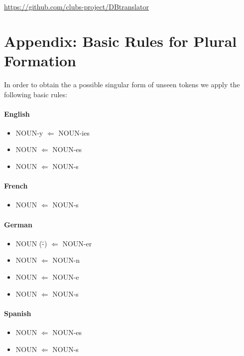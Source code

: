 \documentclass[a4paper,11pt]{article}
\begin{document}
\url{https://github.com/clubs-project/DBtranslator}






%
%
\appendix
\section{Appendix: Basic Rules for Plural Formation}
\label{ap:plural}

In order to obtain the a possible singular form of unseen tokens we apply the following basic rules:

\renewcommand{\labelitemi}{$\star$}
\paragraph{English}
\begin{itemize}
\itemsep-0.2em 
 \item NOUN-y $\Leftarrow$ NOUN-ies
 \item NOUN $\Leftarrow$ NOUN-es
 \item NOUN $\Leftarrow$ NOUN-s
\end{itemize}

\paragraph{French}
\begin{itemize}
\itemsep-0.2em 
 \item NOUN $\Leftarrow$ NOUN-s
\end{itemize}

\paragraph{German}
\begin{itemize}
\itemsep-0.2em 
 \item NOUN (\"-) $\Leftarrow$ NOUN-er
 \item NOUN $\Leftarrow$ NOUN-n
 \item NOUN $\Leftarrow$ NOUN-e
 \item NOUN $\Leftarrow$ NOUN-s
\end{itemize}

\paragraph{Spanish}
\begin{itemize}
\itemsep-0.2em 
 \item NOUN $\Leftarrow$ NOUN-es
 \item NOUN $\Leftarrow$ NOUN-s
\end{itemize}
\end{document}
